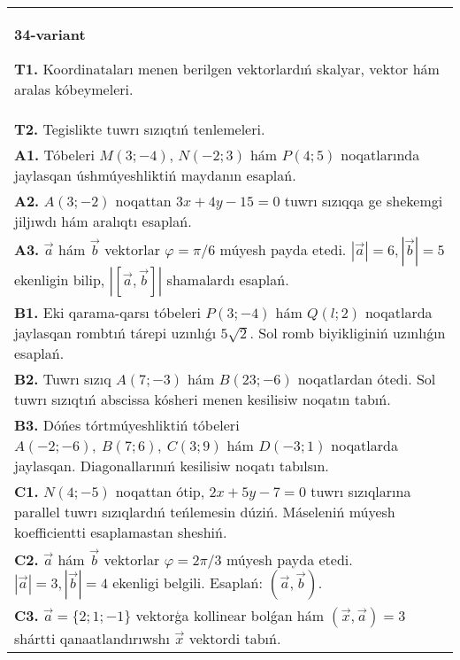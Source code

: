 \documentclass{article}
\begin{document}
\begin{tabular}{m{17cm}}
\textbf{34-variant}

\textbf{T1.} 
Koordinataları menen berilgen vektorlardıń skalyar, vektor hám aralas kóbeymeleri.
 \\
\textbf{T2.} 
Tegislikte tuwrı sızıqtıń tenlemeleri.
 \\
\textbf{A1.} 
Tóbeleri $M (3;-4) $, $N (-2;3) $ hám $P (4;5) $
noqatlarında jaylasqan úshmúyeshliktiń maydanın esaplań.
 \\
\textbf{A2.} 
$A (3;-2) $ noqattan $3x+4y-15=0$ tuwrı sızıqqa
ge shekemgi jiljıwdı hám aralıqtı esaplań.
 \\
\textbf{A3.} 
$\overrightarrow{a}$ hám $\overrightarrow{b}$ vektorlar
$\varphi = \pi/6$ múyesh payda etedi.
$|\overrightarrow{a}| = 6,|\overrightarrow{b}| = 5$ ekenligin bilip,
$\left| \left\lbrack \overrightarrow{a},\overrightarrow{b} \right\rbrack \right|$ shamalardı esaplań.
 \\
\textbf{B1.} 
Eki qarama-qarsı tóbeleri $P (3; -4) $ hám $Q (l;2) $ noqatlarda jaylasqan rombtıń tárepi uzınlıǵı \(5\sqrt{2}\). Sol romb biyikliginiń uzınlıǵın esaplań.
 \\
\textbf{B2.} 
Tuwrı sızıq \(A (7;-3) \) hám \(B (23;-6) \) noqatlardan ótedi.
Sol tuwrı sızıqtıń abscissa kósheri menen kesilisiw noqatın tabıń.
 \\
\textbf{B3.} 
Dóńes tórtmúyeshliktiń tóbeleri
\(A (-2;-6),\ B (7;6),\ C (3;9) \) hám \(D (-3;1) \) noqatlarda
jaylasqan. Diagonallarınıń kesilisiw noqatı tabılsın.
 \\
\textbf{C1.} 
\(N (4;-5) \) noqattan ótip, $2x+5y-7=0$
tuwrı sızıqlarına parallel tuwrı sızıqlardıń teńlemesin dúziń. Máseleniń múyesh
koefficientti esaplamastan sheshiń.
 \\
\textbf{C2.} 
$\vec{a}$ hám $\vec{b}$ vektorlar $\varphi = 2\pi/3$ múyesh payda etedi. $|\vec{a}| = 3,|\vec{b}| = 4$ ekenligi belgili. Esaplań:
$\left(\vec{a},\vec{b} \right) $.
 \\
\textbf{C3.} 
$\vec{a} = \{ 2;1; - 1\}$ vektorģa kollinear bolǵan hám $\left(\vec{x},\vec{a} \right) = 3$ shártti qanaatlandırıwshı $\vec{x}$ vektordi tabıń.
 \\

\end{tabular}
\vspace{1cm}
\end{document}
